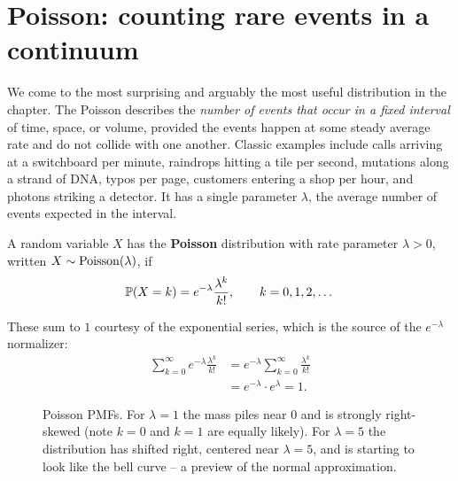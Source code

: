 \section{Poisson: counting rare events in a continuum}
\label{ch07:poisson}

We come to the most surprising and arguably the most useful distribution in the
chapter. The Poisson describes the \emph{number of events that occur in a fixed
interval} of time, space, or volume, provided the events happen at some steady
average rate and do not collide with one another. Classic examples include calls
arriving at a switchboard per minute, raindrops hitting a tile per second,
mutations along a strand of DNA, typos per page, customers entering a shop per
hour, and photons striking a detector. It has a
single parameter $\lambda$, the average number of events expected in the interval.

\begin{definition}
\label{ch07:def-poisson}
A random variable $X$ has the \textbf{Poisson} distribution with rate parameter
$\lambda > 0$, written $X \sim \Pois(\lambda)$, if
\[
  \P(X = k) = e^{-\lambda} \frac{\lambda^{k}}{k!}, \qquad k = 0, 1, 2, \dots
\]
\end{definition}

These sum to $1$ courtesy of the exponential series, which is the source of the
$e^{-\lambda}$ normalizer:
\begin{align*}
  \sum_{k=0}^{\infty} e^{-\lambda} \frac{\lambda^{k}}{k!}
  &= e^{-\lambda} \sum_{k=0}^{\infty} \frac{\lambda^{k}}{k!} \\
  &= e^{-\lambda} \cdot e^{\lambda} = 1.
\end{align*}

\begin{figure}[H]
\centering
{}
\caption{Poisson PMFs. For $\lambda=1$ the mass piles near $0$ and is strongly
right-skewed (note $k=0$ and $k=1$ are equally likely). For $\lambda=5$ the
distribution has shifted right, centered near $\lambda=5$, and is starting to look
like the bell curve -- a preview of the normal approximation.}
\label{ch07:fig-pois-pmf}
\end{figure}


